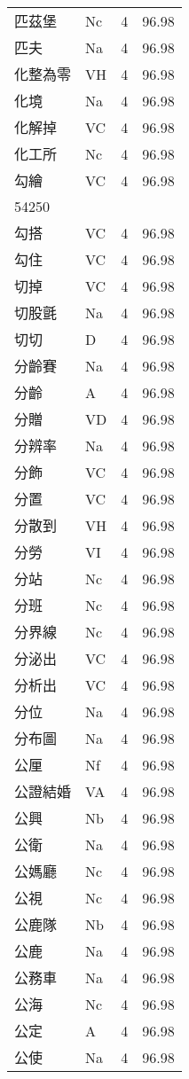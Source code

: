 \documentclass[twocolumn]{book}
\begin{document}
\begin{supertabular}{llrr}
匹茲堡 & Nc & 4 &  96.98\\
匹夫 & Na & 4 &  96.98\\
化整為零 & VH & 4 &  96.98\\
化境 & Na & 4 &  96.98\\
化解掉 & VC & 4 &  96.98\\
化工所 & Nc & 4 &  96.98\\
勾繪 & VC & 4 &  96.98\\
54250\\
勾搭 & VC & 4 &  96.98\\
勾住 & VC & 4 &  96.98\\
切掉 & VC & 4 &  96.98\\
切股氈 & Na & 4 &  96.98\\
切切 & D & 4 &  96.98\\
分齡賽 & Na & 4 &  96.98\\
分齡 & A & 4 &  96.98\\
分贈 & VD & 4 &  96.98\\
分辨率 & Na & 4 &  96.98\\
分飾 & VC & 4 &  96.98\\
分置 & VC & 4 &  96.98\\
分散到 & VH & 4 &  96.98\\
分勞 & VI & 4 &  96.98\\
分站 & Nc & 4 &  96.98\\
分班 & Nc & 4 &  96.98\\
分界線 & Nc & 4 &  96.98\\
分泌出 & VC & 4 &  96.98\\
分析出 & VC & 4 &  96.98\\
分位 & Na & 4 &  96.98\\
分布圖 & Na & 4 &  96.98\\
公厘 & Nf & 4 &  96.98\\
公證結婚 & VA & 4 &  96.98\\
公興 & Nb & 4 &  96.98\\
公衛 & Na & 4 &  96.98\\
公媽廳 & Nc & 4 &  96.98\\
公視 & Nc & 4 &  96.98\\
公鹿隊 & Nb & 4 &  96.98\\
公鹿 & Na & 4 &  96.98\\
公務車 & Na & 4 &  96.98\\
公海 & Nc & 4 &  96.98\\
公定 & A & 4 &  96.98\\
公使 & Na & 4 &  96.98\\

\end{supertabular}
\end{document}
